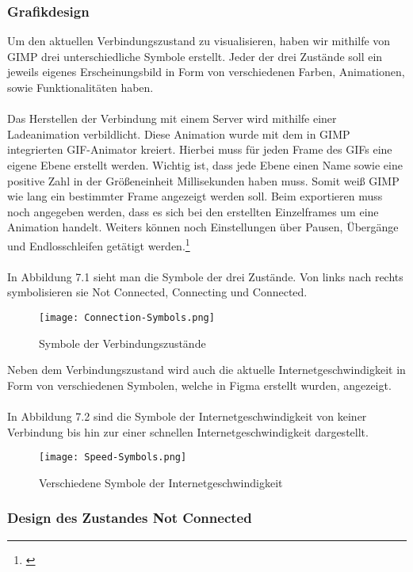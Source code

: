 \subsubsection{Grafikdesign}

Um den aktuellen Verbindungszustand zu visualisieren, haben wir mithilfe von GIMP drei unterschiedliche Symbole erstellt. Jeder der drei Zustände soll ein jeweils eigenes Erscheinungsbild in Form von verschiedenen Farben, Animationen, sowie Funktionalitäten haben. 
\\ \ \\
Das Herstellen der Verbindung mit einem Server wird mithilfe einer Ladeanimation verbildlicht. Diese Animation wurde mit dem in GIMP integrierten GIF-Animator kreiert. Hierbei muss für jeden Frame des GIFs eine eigene Ebene erstellt werden. Wichtig ist, dass jede Ebene einen Name sowie eine positive Zahl in der Größeneinheit Millisekunden haben muss. Somit weiß GIMP wie lang ein bestimmter Frame angezeigt werden soll. Beim exportieren muss noch angegeben werden, dass es sich bei den erstellten Einzelframes um eine Animation handelt. Weiters können noch Einstellungen über Pausen, Übergänge und Endlosschleifen getätigt werden.\footnote[1]{\cite[Vgl.][]{GIF}}
\\ \ \\
In Abbildung 7.1 sieht man die Symbole der drei Zustände. Von links nach rechts symbolisieren sie Not Connected, Connecting und Connected.
\\
\begin{figure}[H]
    \centering
    \texttt{[image: Connection-Symbols.png]}
    \caption{Symbole der Verbindungszustände} 
\end{figure}
\noindent
Neben dem Verbindungszustand wird auch die aktuelle Internetgeschwindigkeit in Form von verschiedenen Symbolen, welche in Figma erstellt wurden, angezeigt.
\\ \ \\
In Abbildung 7.2 sind die Symbole der Internetgeschwindigkeit von keiner Verbindung bis hin zur einer schnellen Internetgeschwindigkeit dargestellt.
\\
\begin{figure}[H]
    \centering
    \texttt{[image: Speed-Symbols.png]}
    \caption{Verschiedene Symbole der Internetgeschwindigkeit} 
\end{figure}

\pagebreak

\subsubsection{Design des Zustandes Not Connected}

